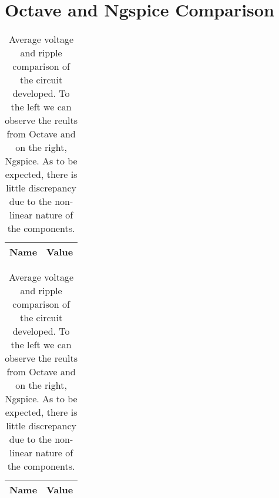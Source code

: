 \section{Octave and Ngspice Comparison}
\label{sec:comparision}

\begin{table}[H]
  \centering
  \begin{tabular}{|l|r|}
    \hline    
    {\bf Name} & {\bf Value} \\ \hline
	
  \end{tabular}
  \begin{tabular}{|l|r|}
    \hline    
    {\bf Name} & {\bf Value} \\ \hline
	
  \end{tabular}
  \caption{Average voltage and ripple comparison of the circuit developed. To the left we can observe the reults from Octave and on the right, Ngspice. As to be expected, there is little discrepancy due to the non-linear nature of the components.}
  \label{tab:comp}
\end{table}
